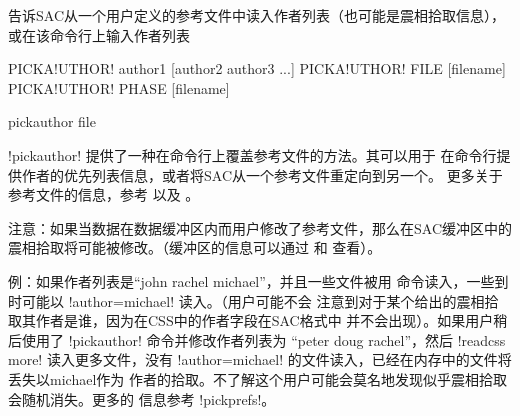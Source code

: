 \label{cmd:pickauthor}

告诉SAC从一个用户定义的参考文件中读入作者列表（也可能是震相拾取信息），
或在该命令行上输入作者列表

\begin{SACSTX}
PICKA!UTHOR! author1 [author2 author3 ...]
PICKA!UTHOR! FILE [filename]
PICKA!UTHOR! PHASE [filename]
\end{SACSTX}


\begin{SACDFT}
pickauthor file
\end{SACDFT}

!pickauthor! 提供了一种在命令行上覆盖参考文件的方法。其可以用于
在命令行提供作者的优先列表信息，或者将SAC从一个参考文件重定向到另一个。
更多关于参考文件的信息，参考  以及 。

注意：如果当数据在数据缓冲区内而用户修改了参考文件，那么在SAC缓冲区中的
震相拾取将可能被修改。（缓冲区的信息可以通过  和
 查看）。

例：如果作者列表是``john rachel michael''，并且一些文件被用 
命令读入，一些到时可能以 !author=michael! 读入。（用户可能不会
注意到对于某个给出的震相拾取其作者是谁，因为在CSS中的作者字段在SAC格式中
并不会出现）。如果用户稍后使用了 !pickauthor! 命令并修改作者列表为
``peter doug rachel''，然后 !readcss more! 读入更多文件，没有
!author=michael! 的文件读入，已经在内存中的文件将丢失以michael作为
作者的拾取。不了解这个用户可能会莫名地发现似乎震相拾取会随机消失。更多的
信息参考 !pickprefs!。

